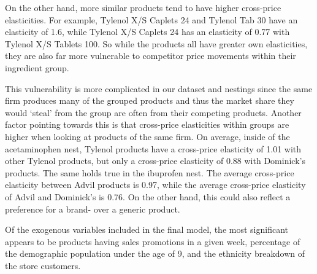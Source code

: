 \documentclass[12pt, authoryear]{elsarticle}
\begin{document}
On the other hand, more similar products tend to have higher cross-price elasticities. For example, Tylenol X/S Caplets 24 and Tylenol Tab 30 have an elasticity of 1.6, while Tylenol X/S Caplets 24 has an elasticity of 0.77 with Tylenol X/S Tablets 100. So while the products all have greater own elasticities, they are also far more vulnerable to competitor price movements within their ingredient group. 

This vulnerability is more complicated in our dataset and nestings since the same firm produces many of the grouped products and thus the market share they would ‘steal’ from the group are often from their competing products. Another factor pointing towards this is that cross-price elasticities within groups are higher when looking at products of the same firm. On average, inside of the acetaminophen nest, Tylenol products have a cross-price elasticity of 1.01 with other Tylenol products, but only a cross-price elasticity of 0.88 with Dominick’s products. The same holds true in the ibuprofen nest. The average cross-price elasticity between Advil products is 0.97, while the average cross-price elasticity of Advil and Dominick’s is 0.76. On the other hand, this could also reflect a preference for a brand- over a generic product.

Of the exogenous variables included in the final model, the most significant appears to be products having sales promotions in a given week, percentage of the demographic population under the age of 9, and the ethnicity breakdown of the store customers.
\end{document}
